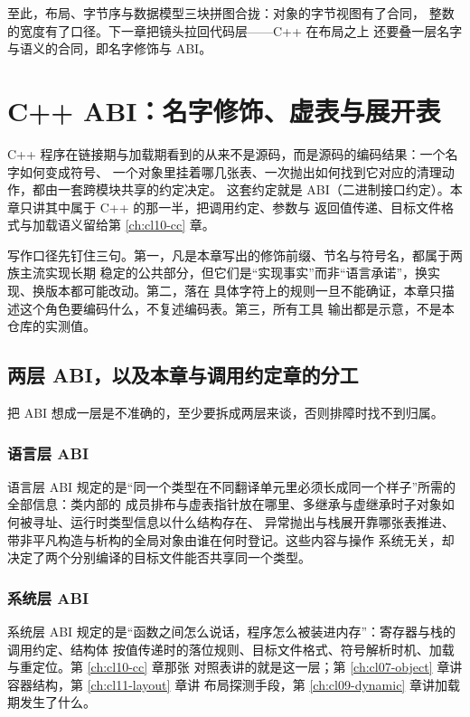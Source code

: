 \documentclass[12pt,a4paper,fontset=fandol]{ctexbook}
\newcommand{\Lang}[1]{\textsf{#1}}
\newcommand{\CPP}{\Lang{C++}}
\begin{document}
至此，布局、字节序与数据模型三块拼图合拢：对象的字节视图有了合同，
整数的宽度有了口径。下一章把镜头拉回代码层——\CPP{} 在布局之上
还要叠一层名字与语义的合同，即名字修饰与 ABI。

\chapter{\CPP{} ABI：名字修饰、虚表与展开表}\label{ch:cl13-cxx-abi}

\CPP{} 程序在链接期与加载期看到的从来不是源码，而是源码的编码结果：一个名字如何变成符号、
一个对象里挂着哪几张表、一次抛出如何找到它对应的清理动作，都由一套跨模块共享的约定决定。
这套约定就是 ABI（二进制接口约定）。本章只讲其中属于 \CPP{} 的那一半，把调用约定、参数与
返回值传递、目标文件格式与加载语义留给第 \ref{ch:cl10-cc} 章。

写作口径先钉住三句。第一，凡是本章写出的修饰前缀、节名与符号名，都属于两族主流实现长期
稳定的公共部分，但它们是“实现事实”而非“语言承诺”，换实现、换版本都可能改动。第二，落在
具体字符上的规则一旦不能确证，本章只描述这个角色要编码什么，不复述编码表。第三，所有工具
输出都是示意，不是本仓库的实测值。

\section{两层 ABI，以及本章与调用约定章的分工}\label{sec:cl13-scope}

把 ABI 想成一层是不准确的，至少要拆成两层来谈，否则排障时找不到归属。

\subsection{语言层 ABI}\label{sec:cl13-scope-lang}

语言层 ABI 规定的是“同一个类型在不同翻译单元里必须长成同一个样子”所需的全部信息：类内部的
成员排布与虚表指针放在哪里、多继承与虚继承时子对象如何被寻址、运行时类型信息以什么结构存在、
异常抛出与栈展开靠哪张表推进、带非平凡构造与析构的全局对象由谁在何时登记。这些内容与操作
系统无关，却决定了两个分别编译的目标文件能否共享同一个类型。

\subsection{系统层 ABI}\label{sec:cl13-scope-os}

系统层 ABI 规定的是“函数之间怎么说话，程序怎么被装进内存”：寄存器与栈的调用约定、结构体
按值传递时的落位规则、目标文件格式、符号解析时机、加载与重定位。第 \ref{ch:cl10-cc} 章那张
对照表讲的就是这一层；第 \ref{ch:cl07-object} 章讲容器结构，第 \ref{ch:cl11-layout} 章讲
布局探测手段，第 \ref{ch:cl09-dynamic} 章讲加载期发生了什么。
\end{document}
